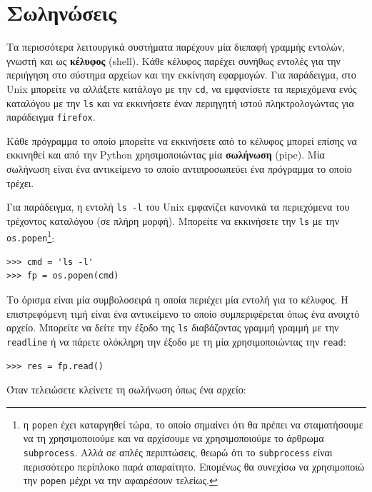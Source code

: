 \documentclass[10pt]{book}
\begin{document}
\section{Σωληνώσεις}

Τα περισσότερα λειτουργικά συστήματα παρέχουν μία διεπαφή γραμμής εντολών, γνωστή και ως {\bf κέλυφος} (shell).
Κάθε κέλυφος παρέχει συνήθως εντολές για την περιήγηση στο σύστημα αρχείων και την εκκίνηση εφαρμογών.
Για παράδειγμα, στο Unix μπορείτε να αλλάξετε κατάλογο με την {\tt cd}, να εμφανίσετε τα περιεχόμενα 
ενός καταλόγου με την {\tt ls} και να εκκινήσετε έναν περιηγητή ιστού πληκτρολογώντας για παράδειγμα {\tt firefox}.

Κάθε πρόγραμμα το οποίο μπορείτε να εκκινήσετε από το κέλυφος μπορεί επίσης να εκκινηθεί και από την Python χρησιμοποιώντας μία {\bf σωλήνωση} (pipe). Μία σωλήνωση είναι ένα αντικείμενο το οποίο αντιπροσωπεύει ένα πρόγραμμα
το οποίο τρέχει.

Για παράδειγμα, η εντολή {\tt ls -l} του Unix εμφανίζει κανονικά τα περιεχόμενα του τρέχοντος καταλόγου
(σε πλήρη μορφή). Μπορείτε να εκκινήσετε την {\tt ls} με την {\tt os.popen}\footnote{η {\tt popen} έχει
καταργηθεί τώρα, το οποίο σημαίνει ότι θα πρέπει να σταματήσουμε να τη χρησιμοποιούμε και να αρχίσουμε να χρησιμοποιούμε το άρθρωμα {\tt subprocess}.  Αλλά σε απλές περιπτώσεις, θεωρώ ότι το {\tt subprocess} είναι περισσότερο περίπλοκο παρά απαραίτητο. Επομένως θα συνεχίσω να χρησιμοποιώ  την {\tt popen} μέχρι να την
αφαιρέσουν τελείως.}:


\begin{verbatim}
>>> cmd = 'ls -l'
>>> fp = os.popen(cmd)
\end{verbatim}
%
Το όρισμα είναι μία συμβολοσειρά η οποία περιέχει μία εντολή για το κέλυφος. Η επιστρεφόμενη τιμή είναι
ένα αντικείμενο το οποίο συμπεριφέρεται όπως ένα ανοιχτό αρχείο. Μπορείτε να δείτε την έξοδο της {\tt ls} 
διαβάζοντας γραμμή γραμμή με την {\tt readline} ή να πάρετε ολόκληρη την έξοδο με τη μία χρησιμοποιώντας την
{\tt read}:

\begin{verbatim}
>>> res = fp.read()
\end{verbatim}
%
Όταν τελειώσετε κλείνετε τη σωλήνωση όπως ένα αρχείο:
\end{document}
